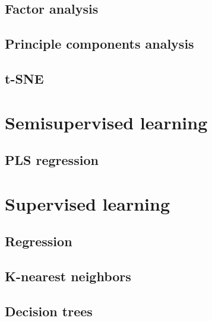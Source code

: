 \documentclass[
]{book}
\begin{document}
\hypertarget{factor-analysis}{%
\subsection{Factor analysis}\label{factor-analysis}}

\hypertarget{principle-components-analysis}{%
\subsection{Principle components analysis}\label{principle-components-analysis}}

\hypertarget{t-sne}{%
\subsection{t-SNE}\label{t-sne}}

\hypertarget{semisupervised-learning}{%
\section{Semisupervised learning}\label{semisupervised-learning}}

\hypertarget{pls-regression}{%
\subsection{PLS regression}\label{pls-regression}}

\hypertarget{supervised-learning}{%
\section{Supervised learning}\label{supervised-learning}}

\hypertarget{regression}{%
\subsection{Regression}\label{regression}}

\hypertarget{k-nearest-neighbors}{%
\subsection{K-nearest neighbors}\label{k-nearest-neighbors}}

\hypertarget{decision-trees}{%
\subsection{Decision trees}\label{decision-trees}}
\end{document}

